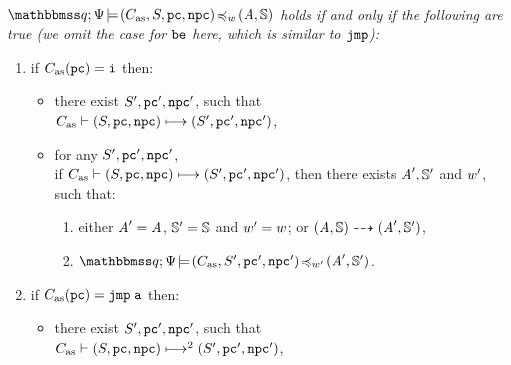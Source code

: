 \begin{definition}
    \label{def:siminsseq}
    \em
    \mbox{} \\
    $\simInsSeq{\relastQ}{\Cspec}{(\asmimp, \state, \pc, \npc)}
        {\word}{(\primcom, \hpstate)}$ holds if and only if
    the following are true
    (we omit the case
    for $\be$ here, which is similar to $\jmp$):

    \small
    \begin{enumerate}[1.]
		\item if $\asmimp(\pc) = \simplins$ then:
		\begin{itemize}
			\item
			there exist $\state', \pc', \npc'$, such that \\
			$\lptrans{\asmimp}{(\state, \pc, \npc)}{(\state', \pc', \npc')}$,
			
			\item
			for any $\state', \pc', \npc'$, \\ if
            $\lptrans{\asmimp}{(\state, \pc, \npc)}{(\state', \pc', \npc')}$, then
            there exists $\primcom', \hpstate'$ and $\word'$, such that:
            \begin{enumerate}[(1)]
                \item either $\primcom' = \primcom$,
                    $\hpstate' = \hpstate$ and $\word' = \word$;
                    or
                    $\primTrans{(\primcom, \hpstate)}
                        {(\primcom', \hpstate')}$,
                \item $\simInsSeq{\relastQ}{\Cspec}
                    {(\asmimp, \state', \pc', \npc')}{\word'}
                    {(\primcom', \hpstate')}$.
            \end{enumerate}
        \end{itemize}

        \item if $\asmimp(\pc) = \jmp \; \aexp$ then:
            \begin{itemize}
                \item there exist $\state', \pc', \npc'$, such that
                \\
                $\multilptrans{\asmimp}{2}{(\state, \pc, \npc)}
                    {(\state', \pc', \npc')}$,


\end{itemize}
\end{enumerate}
\end{definition}

